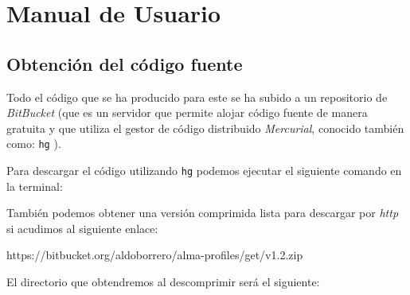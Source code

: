 \chapter{Manual de Usuario}
\label{appendix:apendice-c}

\section{Obtención del código fuente}

Todo el código que se ha producido para este \pfc{} se ha subido a un repositorio de \textit{BitBucket} \cite{web:bitbucket} (que es un servidor que permite alojar código fuente de manera gratuita y que utiliza el gestor de código distribuido \textit{Mercurial}, conocido también como: \texttt{hg} \cite{web:mercurial}).

Para descargar el código utilizando \texttt{hg} podemos ejecutar el siguiente comando en la terminal:


También podemos obtener una versión comprimida lista para descargar por \textit{http} si acudimos al siguiente enlace:

\begin{pyglist}[language=html]
https://bitbucket.org/aldoborrero/alma-profiles/get/v1.2.zip
\end{pyglist}

El directorio que obtendremos al descomprimir será el siguiente:

